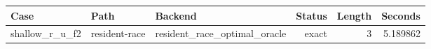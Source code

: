 {\small
\begin{tabular}{lllrrr}
\hline
Case & Path & Backend & Status & Length & Seconds \\
\hline
shallow\_r\_u\_f2 & resident-race & resident\_race\_optimal\_oracle & exact & 3 & 5.189862 \\
\hline
\end{tabular}
}
